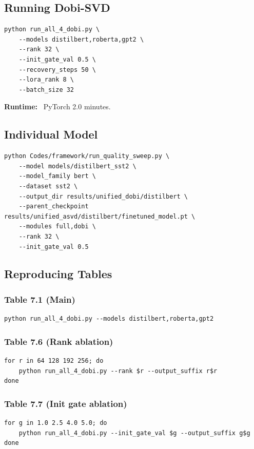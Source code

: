 \subsection{Running Dobi-SVD}

\begin{lstlisting}
python run_all_4_dobi.py \
    --models distilbert,roberta,gpt2 \
    --rank 32 \
    --init_gate_val 0.5 \
    --recovery_steps 50 \
    --lora_rank 8 \
    --batch_size 32
\end{lstlisting}

\textbf{Runtime:} ~PyTorch 2.0 minutes.

\subsection{Individual Model}

\begin{lstlisting}
python Codes/framework/run_quality_sweep.py \
    --model models/distilbert_sst2 \
    --model_family bert \
    --dataset sst2 \
    --output_dir results/unified_dobi/distilbert \
    --parent_checkpoint results/unified_asvd/distilbert/finetuned_model.pt \
    --modules full,dobi \
    --rank 32 \
    --init_gate_val 0.5
\end{lstlisting}

\subsection{Reproducing Tables}

\subsubsection{Table 7.1 (Main)}
\begin{lstlisting}
python run_all_4_dobi.py --models distilbert,roberta,gpt2
\end{lstlisting}

\subsubsection{Table 7.6 (Rank ablation)}
\begin{lstlisting}
for r in 64 128 192 256; do
    python run_all_4_dobi.py --rank $r --output_suffix r$r
done
\end{lstlisting}

\subsubsection{Table 7.7 (Init gate ablation)}
\begin{lstlisting}
for g in 1.0 2.5 4.0 5.0; do
    python run_all_4_dobi.py --init_gate_val $g --output_suffix g$g
done
\end{lstlisting}

